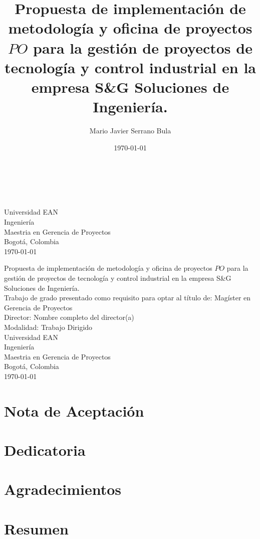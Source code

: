 \documentclass[12pt]{article}
\title{Propuesta de implementación de metodología y oficina de proyectos 
\(PO\) 
para la gestión de proyectos de tecnología y control industrial en la empresa S\&G Soluciones de Ingeniería.
}
\author{Mario Javier Serrano Bula}
\date{\today}
\newcommand{\mydirector}{Nombre completo del director(a)}
\newcommand{\myuniversity}{Universidad EAN}
\newcommand{\myfaculty}{Ingeniería}
\newcommand{\myprogram}{Maestria en Gerencia de Proyectos}
\newcommand{\mycity}{Bogotá, Colombia}
\newcommand{\mytitle}{Propuesta de implementación de metodología y oficina de proyectos 
\(PO\) 
para la gestión de proyectos de tecnología y control industrial en la empresa S\&G Soluciones de Ingeniería.
}
\newcommand{\chapterbreak}{\clearpage \thispagestyle{fancy}}
\begin{document}
\begin{titlepage}
\makeatletter
\@title\\[3cm]
\@author\\
\makeatother

\vfill
\begin{flushleft}
\myuniversity\\
\myfaculty\\
\myprogram\\
\mycity\\
\today
\end{flushleft}
\end{titlepage}

\chapterbreak
\begin{center}
\mytitle\\[2cm]

Trabajo de grado presentado como requisito para optar al título de: Magíster en Gerencia de Proyectos\\[2cm]

Director: \mydirector\\[2cm]
Modalidad: Trabajo Dirigido\\[1.5cm]

\vfill
\myuniversity\\
\myfaculty\\
\myprogram\\
\mycity\\
\today
\end{center}

\chapterbreak
\section*{Nota de Aceptación}


\chapterbreak

\section*{Dedicatoria}


\chapterbreak
\section*{Agradecimientos}


\chapterbreak
\section*{Resumen}

\end{document}
